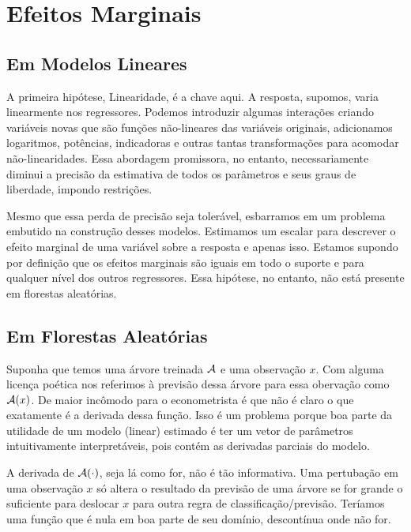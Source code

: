 

\section{Efeitos Marginais}
\subsection{Em Modelos Lineares}
A primeira hipótese, Linearidade, é a chave aqui. A resposta, supomos, varia linearmente nos regressores. Podemos introduzir algumas interações criando variáveis novas que são funções não-lineares das variáveis originais, adicionamos logaritmos, potências, indicadoras e outras tantas transformações para acomodar não-linearidades. Essa abordagem promissora, no entanto, necessariamente diminui a precisão da estimativa de todos os parâmetros e seus graus de liberdade, impondo restrições.

Mesmo que essa perda de precisão seja tolerável, esbarramos em um problema embutido na construção desses modelos. Estimamos um escalar para descrever o efeito marginal de uma variável sobre a resposta e apenas isso. Estamos supondo por definição que os efeitos marginais são iguais em todo o suporte e para qualquer nível dos outros regressores. Essa hipótese, no entanto, não está presente em florestas aleatórias.

\subsection{Em Florestas Aleatórias}

Suponha que temos uma árvore treinada $\mathcal{A}$ e uma observação $x$. Com alguma licença poética nos referimos à previsão dessa árvore para essa obervação como $\mathcal{A}(x)$. De maior incômodo para o econometrista é que não é claro o que exatamente é a derivada dessa função. Isso é um problema porque boa parte da utilidade de um modelo (linear) estimado é ter um vetor de parâmetros intuitivamente interpretáveis, pois contém as derivadas parciais do modelo. 

A derivada de $\mathcal{A}(\cdot)$, seja lá como for, não é tão informativa. Uma pertubação em uma observação $x$ só altera o resultado da previsão de uma árvore se for grande o suficiente para deslocar $x$ para outra regra de classificação/previsão. Teríamos uma função que é nula em boa parte de seu domínio, descontínua onde não for. 

